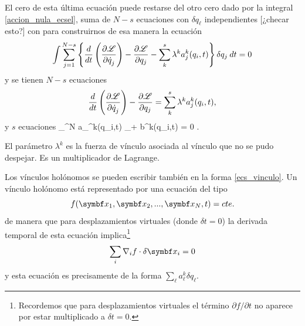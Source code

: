 \documentclass[10pt,oneside]{CBFT_book}
\begin{document}
El cero de esta última ecuación puede restarse del otro cero dado por la integral \eqref{accion_nula_ecsel},
suma de $N-s$ ecuaciones con $\delta q_\ell$ independientes [¿checar esto?] con para construirnos de esa manera la ecuación
\[
	\int \sum_{j=1}^{N-s} \left\{ \frac{d}{dt}\left( \frac{\partial^{\hspace{-0.05em}} {\mathscr{L}}}{\partial {\dot{q}_j}^{\hspace{-0.05em}}} \right) -\frac{\partial^{\hspace{-0.05em}} {\mathscr{L}}}{\partial {q_j}^{\hspace{-0.05em}}}
	- \sum_{k}^s \lambda^k a_j^k(q_i,t) \right\} \delta {q}_j \: dt = 0
\]
y se tienen $N-s$ ecuaciones
\[
	\frac{d}{dt}\left( \frac{\partial^{\hspace{-0.05em}} {\mathscr{L}}}{\partial {\dot{q}_j}^{\hspace{-0.05em}}} \right) -\frac{\partial^{\hspace{-0.05em}} {\mathscr{L}}}{\partial {q_j}^{\hspace{-0.05em}}} =  \sum_{k}^s \lambda^k a_j^k(q_i,t),
\]
y $s$ ecuaciones 
\be
	\sum_{\ell}^N a_\ell^k(q_i,t) _\ell + b^k(q_i,t) = 0 .
	\label{ecs_vinculo}
\ee

El parámetro $ \lambda^k $ es la fuerza de vínculo asociada al vínculo que no se pudo despejar. Es un multiplicador de
Lagrange.

Los vínculos holónomos se pueden escribir también en la forma \eqref{ecs_vinculo}. Un vínculo holónomo está representado
por una ecuación del tipo 
\[
	f( \vb{x}_1, \vb{x}_2, ...,\vb{x}_N, t ) = cte.
\]
de manera que para desplazamientos virtuales (donde $\delta t=0$) la derivada temporal de esta ecuación implica\footnote{Recordemos
que para desplazamientos virtuales el término $\partial f /\partial t$ no aparece por estar multiplicado a $\delta t=0$.} 
\[
	\sum_i \nabla_i f \cdot \delta\vb{x}_i = 0
\]
y esta ecuación es precisamente de la forma $ \sum_\ell a_\ell^k \delta q_\ell $.
\end{document}
